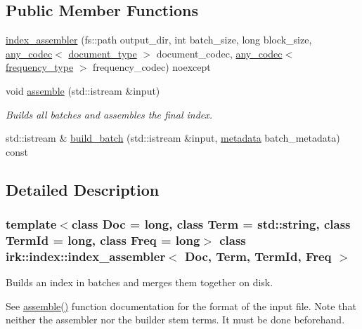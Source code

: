 \subsection*{Public Member Functions}
\begin{DoxyCompactItemize}
\item 
\mbox{\hyperlink{classirk_1_1index_1_1index__assembler_aaf0390e58f47335b54a86c8bfe79cec2}{index\+\_\+assembler}} (fs\+::path output\+\_\+dir, int batch\+\_\+size, long block\+\_\+size, \mbox{\hyperlink{namespaceirk_a831a3a869cf19601dbfb5c41765a2e87}{any\+\_\+codec}}$<$ \mbox{\hyperlink{classirk_1_1index_1_1index__assembler_a42424117b672fc1383b3be13f3338bc4}{document\+\_\+type}} $>$ document\+\_\+codec, \mbox{\hyperlink{namespaceirk_a831a3a869cf19601dbfb5c41765a2e87}{any\+\_\+codec}}$<$ \mbox{\hyperlink{classirk_1_1index_1_1index__assembler_a8da91d64fb4a68136f7978944e7f3373}{frequency\+\_\+type}} $>$ frequency\+\_\+codec) noexcept
\item 
void \mbox{\hyperlink{classirk_1_1index_1_1index__assembler_a14bcac58459efaa300f324dceff82661}{assemble}} (std\+::istream \&input)
\begin{DoxyCompactList}\small\item\em Builds all batches and assembles the final index. \end{DoxyCompactList}\item 
std\+::istream \& \mbox{\hyperlink{classirk_1_1index_1_1index__assembler_a42b294d02349c03a72aaf19a7882f230}{build\+\_\+batch}} (std\+::istream \&input, \mbox{\hyperlink{structirk_1_1index_1_1metadata}{metadata}} batch\+\_\+metadata) const
\end{DoxyCompactItemize}


\subsection{Detailed Description}
\subsubsection*{template$<$class Doc = long, class Term = std\+::string, class Term\+Id = long, class Freq = long$>$\newline
class irk\+::index\+::index\+\_\+assembler$<$ Doc, Term, Term\+Id, Freq $>$}

Builds an index in batches and merges them together on disk.

See \mbox{\hyperlink{classirk_1_1index_1_1index__assembler_a14bcac58459efaa300f324dceff82661}{assemble()}} function documentation for the format of the input file. Note that neither the assembler nor the builder stem terms. It must be done beforehand. 


